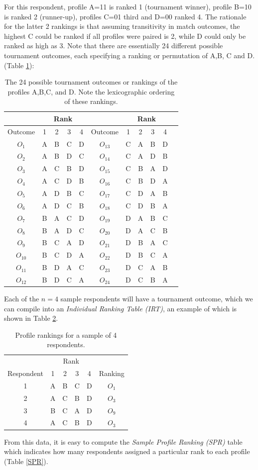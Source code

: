 \documentclass[a4paper, 12pt]{article}
\begin{document}
{\flushleft For} this respondent, profile A=11 is ranked 1 (tournament winner), profile B=10 is ranked 2 (runner-up), profiles C=01 third and D=00 ranked 4. The rationale for the latter 2 rankings is that assuming transitivity in match outcomes, the highest C could be ranked if all profiles were paired is 2, while D could only be ranked as high as 3. Note that there are essentially 24 different possible tournament outcomes, each specifying a ranking or permutation of A,B, C and D.(Table \ref{Tab3}):

\begin{table}[!htpb]
	\scriptsize
	\centering
	\begin{tabular}{c|cccc||cccccc}
		&\multicolumn{4}{c}{Rank}&&\multicolumn{4}{c}{Rank}\\\hline
		Outcome& 1 & 2 & 3&4 &Outcome& 1 & 2 & 3&4  \\\hline
		$O_1$& A&B&C&D&$O_{13}$ &C&A&B&D    \\
		$O_2$& A &B&D&C&$O_{14}$&C&A&D&B     \\
		$O_3$& A&C&B&D&$O_{15}$ &C&B&A&D    \\
		$O_4$& A&C&D&B&$O_{16}$ &C&B&D&A    \\
		$O_5$& A &D&B&C&$O_{17}$ &C&D&A&B    \\
		$O_6$& A&D&C&B&$O_{18}$ &C&D&B&A      \\
		$O_7$& B&A&C&D&$O_{19}$   &D&A&B&C     \\
		$O_8$& B &A&D&C  &$O_{20}$ &D&A&C&B      \\
		$O_9$& B&C&A&D  &$O_{21}$   &D&B&A&C    \\
		$O_{10}$& B&C&D&A  &$O_{22}$ &D&B&C&A   \\
		$O_{11}$& B&D&A&C &$O_{23}$  &D&C&A&B   \\
		$O_{12}$& B&D&C&A &$O_{24}$   &D&C&B&A   \\
	\end{tabular}
	\caption{The 24 possible tournament outcomes or rankings of the profiles A,B,C, and D. Note the lexicographic ordering of these rankings.}
	\label{Tab3}
\end{table}




Each of the $n=4$ sample respondents will have a tournament outcome, which we can compile into an \emph{Individual Ranking Table (IRT)}, an example of which is shown in Table  \ref{Tab1}.
\begin{table}[!htpb]
\centering
\scriptsize
\begin{tabular}{c|cccc|c}
&\multicolumn{4}{c}{Rank}&\\
Respondent& 1 & 2 & 3 & 4&Ranking\\\hline
1& A&B&C&D&$O_1$\\
2& A &C&B&D&$O_3$ \\
3& B &C&A&D& $O_9$ \\
4& A &C&B&D&$O_3$ \\
\end{tabular}
\caption{Profile rankings for a sample of 4 respondents.}
\label{Tab1}
\end{table}
{\flushleft From} this data, it is easy to compute the \emph{Sample Profile Ranking (SPR)} table which indicates how many respondents assigned a particular rank to each profile (Table \ref{SPR}).
\end{document}
